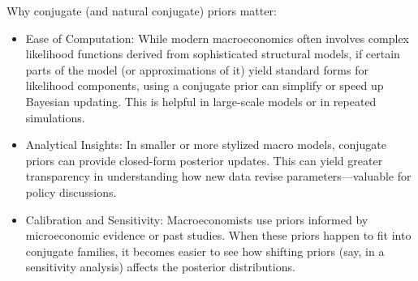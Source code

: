 \begin{enumerate}
Why conjugate (and natural conjugate) priors matter:
\begin{itemize}
\item Ease of Computation:
While modern macroeconomics often involves complex likelihood functions derived from sophisticated structural models,
  if certain parts of the model (or approximations of it) yield standard forms for likelihood components,
  using a conjugate prior can simplify or speed up Bayesian updating.
This is helpful in large-scale models or in repeated simulations.
\item Analytical Insights:
In smaller or more stylized macro models, conjugate priors can provide closed-form posterior updates.
This can yield greater transparency in understanding how new data revise parameters—valuable for policy discussions.
\item Calibration and Sensitivity:
Macroeconomists use priors informed by microeconomic evidence or past studies.
When these priors happen to fit into conjugate families, it becomes easier to see how shifting priors
  (say, in a sensitivity analysis) affects the posterior distributions.
\end{itemize}


\end{enumerate}
